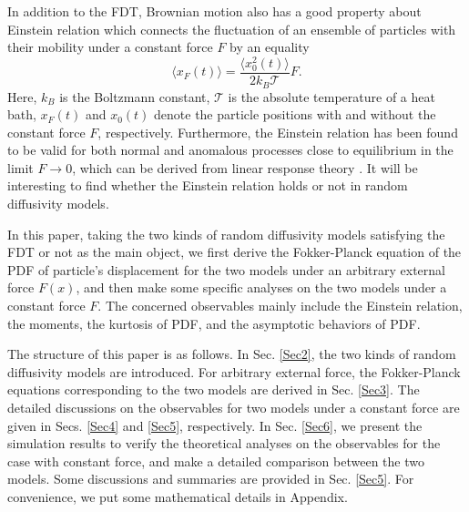 \documentclass[aps,pre,twocolumn,groupedaddress,longbibliography]{revtex4-2}
\begin{document}
In addition to the FDT, Brownian motion also has a good property about Einstein relation which connects the fluctuation of an ensemble of particles with their mobility under a constant force $F$ by an equality \cite{Kubo:1966,MetzlerKlafter:2000}
\begin{equation}\label{ER}
  \langle x_F(t)\rangle=\frac{\langle x_0^2(t)\rangle}{2k_B\mathcal{T}}F.
\end{equation}
Here, $k_B$ is the Boltzmann constant, $\mathcal{T}$ is the absolute temperature of a heat bath, $x_F(t)$ and $x_0(t)$ denote the particle positions with and without the constant force $F$, respectively. Furthermore, the Einstein relation has been found to be valid for both normal and anomalous processes close to equilibrium in the limit $F\rightarrow0$, which can be derived from linear response theory \cite{BarkaiFleurov:1998,BenichouOshanin:2002,ShemerBarkai:2009,FroembergBarkai:2013-3}.
It will be interesting to find whether the Einstein relation holds or not in random diffusivity models.

In this paper, taking the two kinds of random diffusivity models satisfying the FDT or not as the main object, we first derive the Fokker-Planck equation of the PDF of particle's displacement for the two models under an arbitrary external force $F(x)$, and then make some specific analyses on the two models under a constant force $F$. The concerned observables mainly include the Einstein relation, the moments, the kurtosis of PDF, and the asymptotic behaviors of PDF.

The structure of this paper is as follows. In Sec. \ref{Sec2}, the two kinds of random diffusivity models are introduced. For arbitrary external force, the Fokker-Planck equations corresponding to the two models are derived in Sec. \ref{Sec3}. The detailed discussions on the observables for two models under a constant force are given in Secs. \ref{Sec4} and \ref{Sec5}, respectively. In Sec. \ref{Sec6}, we present the simulation results to verify the theoretical analyses on the observables for the case with constant force, and make a detailed comparison between the two models. Some discussions and summaries are provided in Sec. \ref{Sec5}. For convenience, we put some mathematical details in Appendix.
\end{document}
